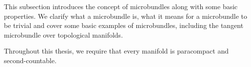 \begin{myparagraph}
    This subsection introduces the concept of microbundles
    along with some basic properties.
    We clarify what a microbundle is, what it means for a microbundle to be trivial and 
    cover some basic examples of microbundles, including the tangent microbundle over topological manifolds.

    Throughout this thesis,
    we require that every manifold is paracompact and second-countable.
\end{myparagraph}








